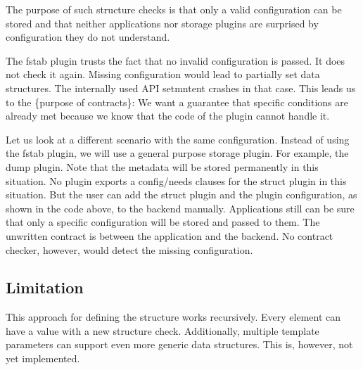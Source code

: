 The purpose of such structure checks is that only a valid configuration can be stored and that neither applications nor storage plugins are surprised by configuration they do not understand.

The fstab plugin trusts the fact that no invalid configuration is passed. It does not check it again. Missing configuration would lead to partially set data structures. The internally used A\+P\+I {\ttfamily setmntent} crashes in that case. This leads us to the \{purpose of contracts\}\+: We want a guarantee that specific conditions are already met because we know that the code of the plugin cannot handle it.

Let us look at a different scenario with the same configuration. Instead of using the fstab plugin, we will use a general purpose storage plugin. For example, the dump plugin. Note that the metadata will be stored permanently in this situation. No plugin exports a {\ttfamily config/needs} clauses for the struct plugin in this situation. But the user can add the struct plugin and the plugin configuration, as shown in the code above, to the backend manually. Applications still can be sure that only a specific configuration will be stored and passed to them. The unwritten contract is between the application and the backend. No contract checker, however, would detect the missing configuration.

\subsection*{Limitation}

This approach for defining the structure works recursively. Every element can have a value with a new structure check. Additionally, multiple template parameters can support even more generic data structures. This is, however, not yet implemented. 